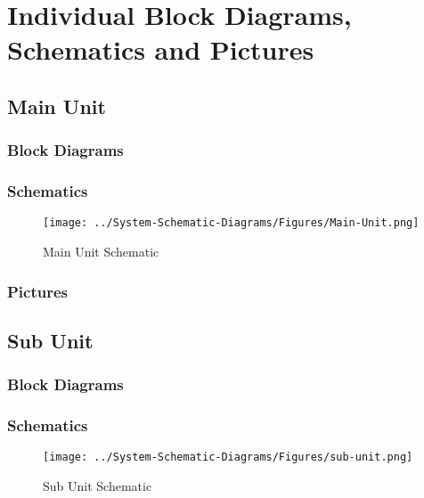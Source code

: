 \section{Individual Block Diagrams, Schematics and Pictures}
\subsection{Main Unit}
\subsubsection{Block Diagrams}
\subsubsection{Schematics}
\begin{landscape}
  \begin{center}
  \begin{figure}[H]
    \texttt{[image: ../System-Schematic-Diagrams/Figures/Main-Unit.png]}
    \caption{Main Unit Schematic}
    \label{fig:main-unit-schematic}
  \end{figure}
  \end{center}
\end{landscape}
\subsubsection{Pictures}
\subsection{Sub Unit}
\subsubsection{Block Diagrams}
\subsubsection{Schematics}
\begin{landscape}
  \begin{center}
  \begin{figure}[H]
    \texttt{[image: ../System-Schematic-Diagrams/Figures/sub-unit.png]}
    \caption{Sub Unit Schematic}
    \label{fig:sub-unit-schematic}
  \end{figure}
  \end{center}
\end{landscape}
